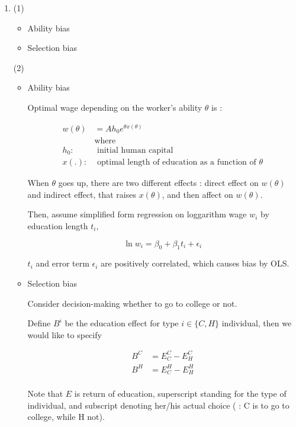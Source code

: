 \documentclass[dvipdfmx]{jsarticle}
\begin{document}
\begin{enumerate}
 \item
 
 (1) 
  \begin{itemize}
  
  \item Ability bias
  
  \item Selection bias
  
  \end{itemize}
 
 (2) 
  \begin{itemize}
  
  \item Ability bias
  
  Optimal wage depending on the worker's ability $\theta$ is : 
  
   \begin{align*}
   w(\theta) & = A h_0 e^{\theta x(\theta)} \\
   & \text{where } \\
   h_0 : & \text{ initial human capital} \\
   x(.) : & \text{ optimal length of education as a function of } \theta
   \end{align*}
  
  When $\theta$ goes up, there are two different effects : direct effect on $w(\theta)$ and indirect effect, that raises $x(\theta)$, and then affect on $w(\theta)$.
  
  Then, assume simplified form regression on loggarithm wage $w_i$ by education length $t_i$,
  
  \[ \ln w_i = \beta_0 + \beta_1 t_i + \epsilon_i \]
  
  $t_i$ and error term $\epsilon_i$ are positively correlated, which causes bias by OLS.
  
  \item Selection bias
  
  Consider decision-making whether to go to college or not.
  
  Define $B^i$ be the education effect for type $i \in \{ C, H \}$ individual, then we would like to specify
  
   \begin{align*}
   B^C &= E_C^C - E_H^C \\
   B^H &= E_C^H - E_H^H \\
   \end{align*}
  
  Note that $E$ is return of education, superscript standing for the type of individual, and subscript denoting her/his actual choice ( : C is to go to college, while H not).
  

\end{itemize}
\end{enumerate}
\end{document}
